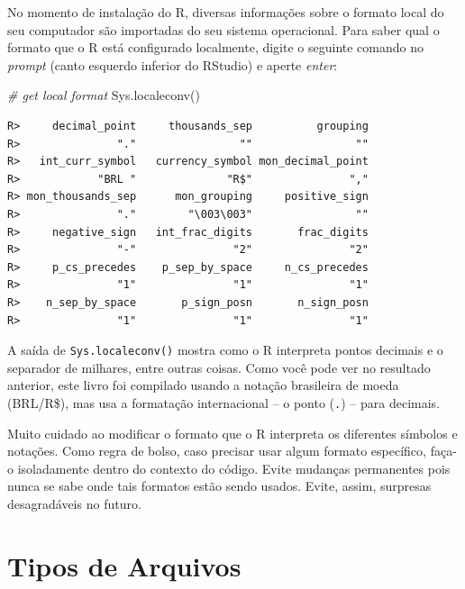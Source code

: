 \documentclass[
  11pt,
]{book}
\newenvironment{Shaded}{\begin{snugshade}}{\end{snugshade}}
\newcommand{\CommentTok}[1]{\textcolor[rgb]{0.37,0.37,0.37}{\textit{#1}}}
\newcommand{\FunctionTok}[1]{\textcolor[rgb]{0,0,0}{#1}}
\newcommand{\NormalTok}[1]{#1}
\newenvironment{rmdcaution}
{\begin{cautionblock}

} {\end{cautionblock}}
\begin{document}
No momento de instalação do R, diversas informações sobre o formato local do seu computador são importadas do seu sistema operacional. Para saber qual o formato que o R está configurado localmente, digite o seguinte comando no \emph{prompt} (canto esquerdo inferior do RStudio) e aperte \emph{enter}:

\begin{Shaded}
\begin{Highlighting}[]
\CommentTok{\# get local format}
\FunctionTok{Sys.localeconv}\NormalTok{()}
\end{Highlighting}
\end{Shaded}

\begin{verbatim}
R>     decimal_point     thousands_sep          grouping 
R>               "."                ""                "" 
R>   int_curr_symbol   currency_symbol mon_decimal_point 
R>            "BRL "              "R$"               "," 
R> mon_thousands_sep      mon_grouping     positive_sign 
R>               "."        "\003\003"                "" 
R>     negative_sign   int_frac_digits       frac_digits 
R>               "-"               "2"               "2" 
R>     p_cs_precedes    p_sep_by_space     n_cs_precedes 
R>               "1"               "1"               "1" 
R>    n_sep_by_space       p_sign_posn       n_sign_posn 
R>               "1"               "1"               "1"
\end{verbatim}

A saída de \texttt{Sys.localeconv()} mostra como o R interpreta pontos decimais e o separador de milhares, entre outras coisas. Como você pode ver no resultado anterior, este livro foi compilado usando a notação brasileira de moeda (BRL/R\$), mas usa a formatação internacional -- o ponto (\texttt{.}) -- para decimais.

\begin{rmdcaution}
Muito cuidado ao modificar o formato que o R interpreta os diferentes
símbolos e notações. Como regra de bolso, caso precisar usar algum
formato específico, faça-o isoladamente dentro do contexto do código.
Evite mudanças permanentes pois nunca se sabe onde tais formatos estão
sendo usados. Evite, assim, surpresas desagradáveis no futuro.
\end{rmdcaution}

\hypertarget{tipos-de-arquivos}{%
\section{Tipos de Arquivos}\label{tipos-de-arquivos}}
\end{document}

